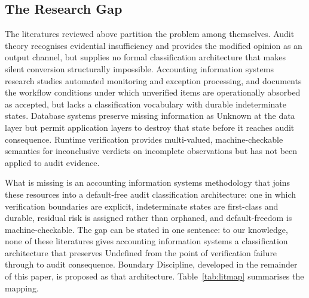 \documentclass[11pt,a4paper]{article}
\theoremstyle{definition}
\theoremstyle{remark}
\begin{document}
\subsection{The Research Gap}
\label{sec:lit-gap}

The literatures reviewed above partition the problem among themselves. Audit theory recognises evidential insufficiency and provides the modified opinion as an output channel, but supplies no formal classification architecture that makes silent conversion structurally impossible. Accounting information systems research studies automated monitoring and exception processing, and documents the workflow conditions under which unverified items are operationally absorbed as accepted, but lacks a classification vocabulary with durable indeterminate states. Database systems preserve missing information as \textsf{Unknown} at the data layer but permit application layers to destroy that state before it reaches audit consequence. Runtime verification provides multi-valued, machine-checkable semantics for inconclusive verdicts on incomplete observations but has not been applied to audit evidence.

What is missing is an accounting information systems methodology that joins these resources into a default-free audit classification architecture: one in which verification boundaries are explicit, indeterminate states are first-class and durable, residual risk is assigned rather than orphaned, and default-freedom is machine-checkable. The gap can be stated in one sentence: to our knowledge, none of these literatures gives accounting information systems a classification architecture that preserves \textsf{Undefined} from the point of verification failure through to audit consequence. Boundary Discipline, developed in the remainder of this paper, is proposed as that architecture. Table~\ref{tab:litmap} summarises the mapping.
\end{document}
